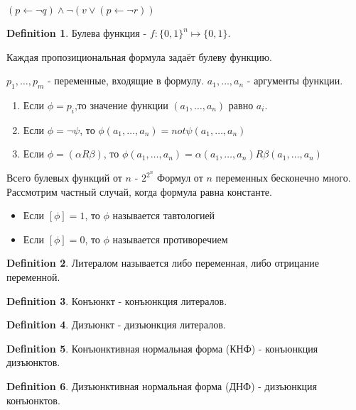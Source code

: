 \documentclass[a4paper]{article}
\theoremstyle{plain}
\theoremstyle{remark}
\theoremstyle{definition}
\newtheorem{definition}{Definition}
\begin{document}
\begin{example}
	$(p \leftarrow \lnot q) \land \lnot (v \lor (p \leftarrow \lnot r))$
\end{example}
\begin{definition}
	Булева функция - $f:\{0,1\}^n \mapsto \{0,1\}$.
\end{definition}

Каждая пропозициональная формула задаёт булеву функцию.

$p_1, \ldots, p_m$ - переменные, входящие в формулу.
$a_1, \ldots, a_n$ - аргументы функции.

\begin{enumerate}
	\item Если $\phi = p_i$,то значение функции $(a_1, \ldots, a_n)$ равно $a_i$.
	\item Если $\phi = \lnot \psi$, то $\phi(a_1, \ldots, a_n) = not \psi(a_1, \ldots, a_n)$
	\item Если $\phi = (\alpha R \beta)$, то $\phi(a_1, \ldots, a_n) = \alpha(a_1, \ldots, a_n) R \beta(a_1, \ldots, a_n)$
\end{enumerate}

Всего булевых функций от $n$ - $2 ^ {2 ^ n}$
Формул от $n$ переменных бесконечно много.
Рассмотрим частный случай, когда формула равна константе. 
\begin{itemize}
	\item Если $[\phi] = 1$, то $\phi$ называется тавтологией %
	\item Если $[\phi] = 0$, то $\phi$ называется противоречием
\end{itemize}
\begin{definition}
	Литералом называется либо переменная, либо отрицание переменной.
\end{definition}

\begin{definition}
	Конъюнкт - конъюнкция литералов.
\end{definition}

\begin{definition}
	Дизъюнкт - дизъюнкция литералов.
\end{definition}

\begin{definition}
	Конъюнктивная нормальная форма (КНФ) - конъюнкция дизъюнктов.
\end{definition}

\begin{definition} 
	Дизъюнктивная нормальная форма (ДНФ) - дизъюнкция конъюнктов.
\end{definition}
\end{document}
